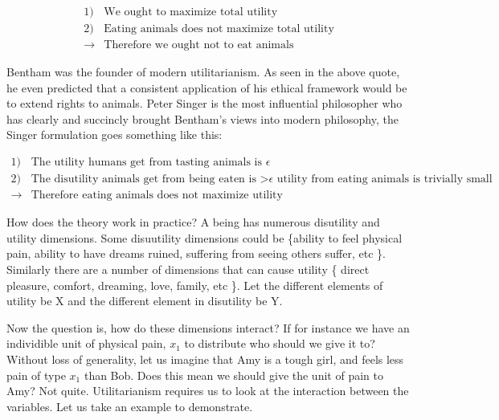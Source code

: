 \documentclass[12pt]{report}
\numberwithin{equation}{section}
\begin{document}
\begin{tcolorbox}[enhanced,%
  colback=green!25!black!10!white,colframe=green!75!black,title=Fit box (5cm),
  drop fuzzy shadow,watermark color=white,watermark text=Fit]
\begin{align*}
1)& \text{We ought to maximize total utility} \\
2)& \text{Eating animals does not maximize total utility} \\
\rightarrow& \text{Therefore we ought not to eat animals}
\end{align*}
\end{tcolorbox}

Bentham was the founder of modern utilitarianism. As seen in the above quote, he even predicted that a consistent application of his ethical framework would be to extend rights to animals. Peter Singer is the most influential philosopher who has clearly and succincly brought Bentham's views into modern philosophy, the Singer formulation goes something like this: 

\begin{tcolorbox}[enhanced,%
  colback=green!25!black!10!white,colframe=green!75!black,title=Fit box (5cm),
  drop fuzzy shadow,watermark color=white,watermark text=Fit]
\begin{align*}
1)& \text{The utility humans get from tasting animals is $\epsilon$} \\
2)& \text{The disutility animals get from being eaten is >$\epsilon$ utility from eating animals is trivially small} \\
\rightarrow& \text{Therefore eating animals does not maximize utility}
\end{align*}
\end{tcolorbox}

How does the theory work in practice? A being has numerous disutility and utility dimensions. Some disuutility dimensions could be \{ability to feel physical pain, ability to have dreams ruined, suffering from seeing others suffer, etc \}. Similarly there are a number of dimensions that can cause utility \{ direct pleasure, comfort, dreaming, love, family, etc \}. Let the different elements of utility be X and the different element in disutility be Y. 

Now the question is, how do these dimensions interact? If for instance we have an individible unit of physical pain, $x_1$ to distribute who should we give it to? Without loss of generality, let us imagine that Amy is a tough girl, and feels less pain of type $x_1$ than Bob. Does this mean we should give the unit of pain to Amy? Not quite. Utilitarianism requires us to look at the interaction between the variables. Let us take an example to demonstrate. 
\end{document}
